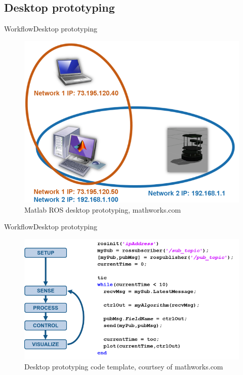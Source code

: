 \documentclass{beamer}
\begin{document}
\subsection{Desktop prototyping}
\begin{frame}{Workflow}{Desktop prototyping}
\begin{figure}
\includegraphics[scale=0.3]{figs/img/desktopproto.png}
\caption{Matlab ROS desktop prototyping, mathworks.com}
\end{figure}
\end{frame}
\begin{frame}{Workflow}{Desktop prototyping}
\begin{figure}
\includegraphics[scale=0.4]{figs/img/desktopproto2.png}
\caption{Desktop prototyping code template, courtsey of mathworks.com}
\end{figure}
\end{frame}
\end{document}
